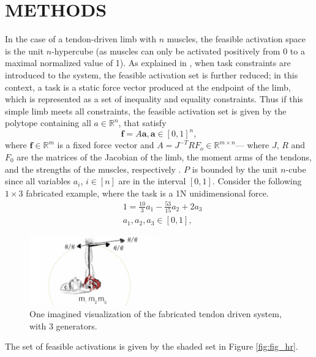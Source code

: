 \section{METHODS}
\label{s:methods}
In the case of a tendon-driven limb with $n$ muscles, the feasible activation space is the unit $n$-hypercube (as muscles can only be activated positively from 0 to a maximal normalized value of 1). As explained in \cite{Valero-Cuevas2009mathematical}, when task constraints are introduced to the system, the feasible activation set is further reduced; in this context, a task is a static force vector produced at the endpoint of the limb, which is represented as a set of inequality and equality constraints. Thus if this simple limb meets all constraints, the feasible activation set is given by the polytope containing all $a \in \mathbb{R}^n$, that satisfy
\[\textbf{f} = A\textbf{a}, \textbf{a} \in [0,1]^n,\]
where $\textbf{f} \in \mathbb{R}^m$ is a fixed force vector and $A = J^{-T}RF_o \in \mathbb{R}^{m \times n}$--- where $J$, $R$ and $F_0$ are the matrices of the Jacobian of the limb, the moment arms of the tendons, and the strengths of the muscles, respectively \cite{Valero-Cuevas1998Large,Valero-Cuevas2009mathematical}. $P$ is bounded by the unit $n$-cube since all variables $a_i$, $i \in [n]$ are in the interval $[0,1]$.
Consider the following $1 \times 3$ fabricated example, where the task is a 1N unidimensional force.
\begin{align*}
&1 = \frac{10}{3}a_1 - \frac{53}{15}a_2 + 2a_3 \\
&a_1, a_2, a_3 \in [0,1],
\end{align*}

\begin{figure}[schematic_arm]
  \label{fig:schematic_arm}
  \centering
  \includegraphics[width=0.5\textwidth]{sections/figs/schematic_example_drawing.pdf}
  \caption{One imagined visualization of the fabricated tendon driven system, with 3 generators.}
  \label{fig:finger}
\end{figure}


The set of feasible activations is given by the shaded set in Figure \ref{fig:fig_hr}.

